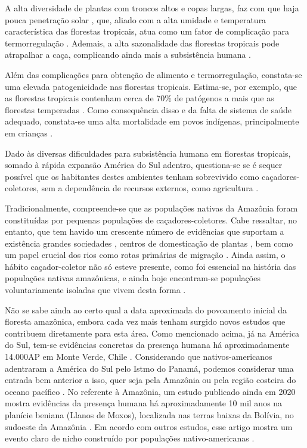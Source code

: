 A alta diversidade de plantas com troncos altos e copas largas, faz com que haja pouca penetração solar \cite{ratnam_when_2011}, que, aliado com a alta umidade e temperatura característica das florestas tropicais, atua como um fator de complicação para termorregulação \cite{perry_evolution_2009}. Ademais, a alta sazonalidade das florestas tropicais pode atrapalhar a caça, complicando ainda mais a subsistência humana \cite{hart_ecological_1986,bailey_hunting_1989}.

Além das complicações para obtenção de alimento e termorregulação, constata-se uma elevada patogenicidade nas florestas tropicais. Estima-se, por exemplo, que as florestas tropicais contenham cerca de 70\% de patógenos a mais que as florestas temperadas \cite{guernier_ecology_2004}. Como consequência disso e da falta de sistema de saúde adequado, constata-se uma alta mortalidade em povos indígenas, principalmente em crianças \cite{ohenjo_health_2006}.

Dado às diversas dificuldades para subsistência humana em florestas tropicais, somado à rápida expansão América do Sul adentro, questiona-se se é sequer possível que os habitantes destes ambientes tenham sobrevivido como caçadores-coletores, sem a dependência de recursos externos, como agricultura \cite{bailey_hunting_1989}. 

Tradicionalmente, compreende-se que as populações nativas da Amazônia foram constituídas por pequenas populações de caçadores-coletores. Cabe ressaltar, no entanto, que tem havido um crescente número de evidências que suportam a existência grandes sociedades \cite{heckenberger_amazonian_2009,de_souza_pre-columbian_2018}, centros de domesticação de plantas \cite{clement_origin_2010,clement_domestication_2015}, bem como um papel crucial dos rios como rotas primárias de migração \cite{arias_high-resolution_2018}. Ainda assim, o hábito caçador-coletor não só esteve presente, como foi essencial na história das populações nativas amazônicas, e ainda hoje encontram-se populações voluntariamente isoladas que vivem desta forma \cite{oliveira_cacadores_2007}. 

Não se sabe ainda ao certo qual a data aproximada do povoamento inicial da floresta amazônica, embora cada vez mais tenham surgido novos estudos que contribuem diretamente para esta área. Como mencionado acima, já na América do Sul, tem-se evidências concretas da presença humana há aproximadamente 14.000AP em Monte Verde, Chile \cite{dillehay_probing_2009}. Considerando que nativos-americanos adentraram a América do Sul pelo Istmo do Panamá, podemos considerar uma entrada bem anterior a isso, quer seja pela Amazônia ou pela região costeira do oceano pacífico \cite{potter_current_2018}. No referente à Amazônia, um estudo publicado ainda em 2020 mostra evidências da presença humana há aproximadamente 10 mil anos na planície beniana (Llanos de Moxos), localizada nas terras baixas da Bolívia, no sudoeste da Amazônia \cite{lombardo_early_2020}. Em acordo com outros estudos, esse artigo mostra um evento claro de nicho construído por populações nativo-americanas \cite{hunemeier_evolutionary_2012,watling_direct_2018}.

